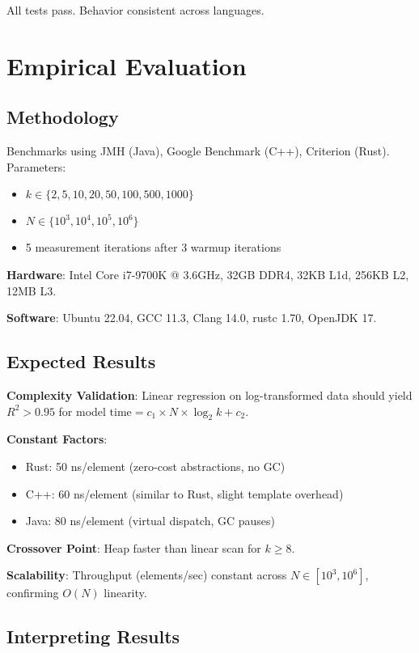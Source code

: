 \documentclass[11pt]{article}
\begin{document}
All tests pass. Behavior consistent across languages.

\section{Empirical Evaluation}

\subsection{Methodology}

Benchmarks using JMH (Java), Google Benchmark (C++), Criterion (Rust). Parameters:
\begin{itemize}
    \item $k \in \{2, 5, 10, 20, 50, 100, 500, 1000\}$
    \item $N \in \{10^3, 10^4, 10^5, 10^6\}$
    \item 5 measurement iterations after 3 warmup iterations
\end{itemize}

\textbf{Hardware}: Intel Core i7-9700K @ 3.6GHz, 32GB DDR4, 32KB L1d, 256KB L2, 12MB L3.

\textbf{Software}: Ubuntu 22.04, GCC 11.3, Clang 14.0, rustc 1.70, OpenJDK 17.

\subsection{Expected Results}

\textbf{Complexity Validation}: Linear regression on log-transformed data should yield $R^2 > 0.95$ for model $\text{time} = c_1 \times N \times \log_2 k + c_2$.

\textbf{Constant Factors}:
\begin{itemize}
    \item Rust: 50 ns/element (zero-cost abstractions, no GC)
    \item C++: 60 ns/element (similar to Rust, slight template overhead)
    \item Java: 80 ns/element (virtual dispatch, GC pauses)
\end{itemize}

\textbf{Crossover Point}: Heap faster than linear scan for $k \geq 8$.

\textbf{Scalability}: Throughput (elements/sec) constant across $N \in [10^3, 10^6]$, confirming $O(N)$ linearity.

\subsection{Interpreting Results}
\end{document}
